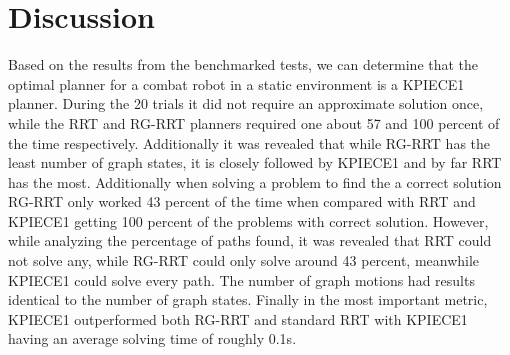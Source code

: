 \documentclass[conference]{IEEEtran}
\begin{document}
\section{Discussion}
Based on the results from the benchmarked tests, we can determine that the optimal planner for a combat robot in a static environment is a KPIECE1 planner.  During the 20 trials it did not require an approximate solution once, while the RRT and RG-RRT planners required one about 57 and 100 percent of the time respectively.  Additionally it was revealed that while RG-RRT has the least number of graph states, it is closely followed by KPIECE1 and by far RRT has the most.  Additionally when solving a problem to find the a correct solution RG-RRT only worked 43 percent of the time when compared with RRT and KPIECE1 getting 100 percent of the problems with correct solution.  However, while analyzing the percentage of paths found, it was revealed that RRT could not solve any, while RG-RRT could only solve around 43 percent, meanwhile KPIECE1 could solve every path.  The number of graph motions had results identical to the number of graph states. Finally in the most important metric, KPIECE1 outperformed both RG-RRT and standard RRT with KPIECE1 having an average solving time of roughly 0.1s.
\end{document}
